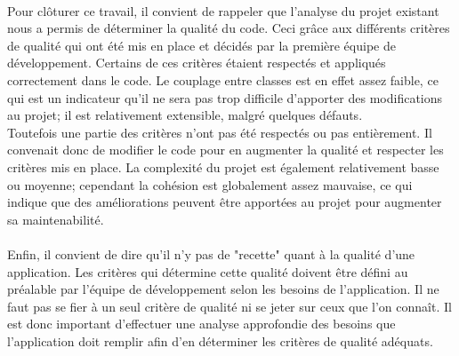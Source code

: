 \paragraph{}
Pour clôturer ce travail, il convient de rappeler que l'analyse du projet existant nous a permis de déterminer la qualité du code. Ceci grâce aux différents critères de qualité qui ont été mis en place et décidés par la première équipe de développement. Certains de ces critères étaient respectés et appliqués correctement dans le code. Le couplage entre classes est en effet assez faible, ce qui est un indicateur qu'il ne sera pas trop difficile d'apporter des modifications au projet; il est relativement extensible, malgré quelques défauts. 
\\
Toutefois une partie des critères n'ont pas été respectés ou pas entièrement. Il convenait donc de modifier le code pour en augmenter la qualité et respecter les critères mis en place. La complexité du projet est également relativement basse ou moyenne; cependant la cohésion est globalement assez mauvaise, ce qui indique que des améliorations peuvent être apportées au projet pour augmenter sa maintenabilité. 

\paragraph{}
Enfin, il convient de dire qu'il n'y pas de "recette" quant à la qualité d'une application. Les critères qui détermine cette qualité doivent être défini au préalable par l'équipe de développement selon les besoins de l'application. Il ne faut pas se fier à un seul critère de qualité ni se jeter sur ceux que l'on connaît. Il est donc important d'effectuer une analyse approfondie des besoins que l'application doit remplir afin d'en déterminer les critères de qualité adéquats.
